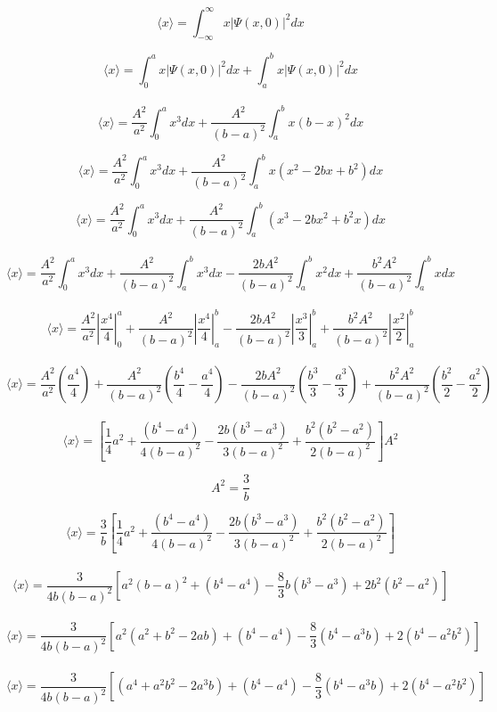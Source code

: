 \documentclass[10pt,a4papper]{article}
\begin{document}
\[\langle x\rangle=\int_{-\infty}^\infty x|\Psi(x,0)|^2dx\]

\[\langle x\rangle=\int_0^a x|\Psi(x,0)|^2dx+\int_a^b x|\Psi(x,0)|^2dx\]\\

\[\langle x\rangle=\frac{A^2}{a^2}\int_0^a x^3dx+\frac{A^2}{(b-a)^2}\int_a^b x(b-x)^2dx\]

\[\langle x\rangle=\frac{A^2}{a^2}\int_0^a x^3dx+\frac{A^2}{(b-a)^2}\int_a^b x(x^2-2bx+b^2)dx\]

\[\langle x\rangle=\frac{A^2}{a^2}\int_0^a x^3dx+\frac{A^2}{(b-a)^2}\int_a^b (x^3-2bx^2+b^2x)dx\]\\

\[\langle x\rangle=
\frac{A^2}{a^2}\int_0^a x^3dx
+\frac{A^2}{(b-a)^2}\int_a^b x^3dx
-\frac{2bA^2}{(b-a)^2}\int_a^b x^2dx
+\frac{b^2A^2}{(b-a)^2}\int_a^b xdx\]\\

\[\langle x\rangle=
\frac{A^2}{a^2}\left|\frac{x^4}{4}\right|_0^a
+\frac{A^2}{(b-a)^2}\left|\frac{x^4}{4}\right|_a^b
-\frac{2bA^2}{(b-a)^2}\left|\frac{x^3}{3}\right|_a^b
+\frac{b^2A^2}{(b-a)^2}\left|\frac{x^2}{2}\right|_a^b\]\\

\[\langle x\rangle=
\frac{A^2}{a^2}\left(\frac{a^4}{4}\right)
+\frac{A^2}{(b-a)^2}\left(\frac{b^4}{4}-\frac{a^4}{4}\right)
-\frac{2bA^2}{(b-a)^2}\left(\frac{b^3}{3}-\frac{a^3}{3}\right)
+\frac{b^2A^2}{(b-a)^2}\left(\frac{b^2}{2}-\frac{a^2}{2}\right)\]\\

\[\langle x\rangle=
\left[\frac{1}{4}a^2
+\frac{(b^4-a^4)}{4(b-a)^2}
-\frac{2b(b^3-a^3)}{3(b-a)^2}
+\frac{b^2(b^2-a^2)}{2(b-a)^2}\right]A^2\]

\newpage
\[A^2=\frac{3}{b}\]

\[\langle x\rangle=
\frac{3}{b}
\left[\frac{1}{4}a^2
+\frac{(b^4-a^4)}{4(b-a)^2}
-\frac{2b(b^3-a^3)}{3(b-a)^2}
+\frac{b^2(b^2-a^2)}{2(b-a)^2}\right]\]\\

\[\langle x\rangle=
\frac{3}{4b(b-a)^2}
\left[a^2(b-a)^2
+(b^4-a^4)
-\frac{8}{3}b(b^3-a^3)
+2b^2(b^2-a^2)\right]\]\\

\[\langle x\rangle=
\frac{3}{4b(b-a)^2}
\left[a^2(a^2+b^2-2ab)
+(b^4-a^4)
-\frac{8}{3}(b^4-a^3b)
+2(b^4-a^2b^2)\right]\]\\

\[\langle x\rangle=
\frac{3}{4b(b-a)^2}
\left[(a^4+a^2b^2-2a^3b)
+(b^4-a^4)
-\frac{8}{3}(b^4-a^3b)
+2(b^4-a^2b^2)\right]\]\\
\end{document}
